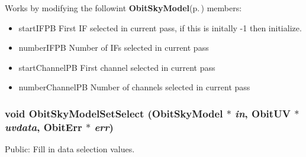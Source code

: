 Works by modifying the followint {\bf Obit\-Sky\-Model}{\rm (p.\,\pageref{structObitSkyModel})} members: \begin{itemize}
\item start\-IFPB First IF selected in current pass, if this is initally -1 then initialize. \item number\-IFPB Number of IFs selected in current pass \item start\-Channel\-PB First channel selected in current pass \item number\-Channel\-PB Number of channels selected in current pass 
\end{itemize}
\subsubsection{\setlength{\rightskip}{0pt plus 5cm}void Obit\-Sky\-Model\-Set\-Select ({\bf Obit\-Sky\-Model} $\ast$ {\em in}, {\bf Obit\-UV} $\ast$ {\em uvdata}, {\bf Obit\-Err} $\ast$ {\em err})}\label{ObitSkyModel_8h_a71}


Public: Fill in data selection values. 

